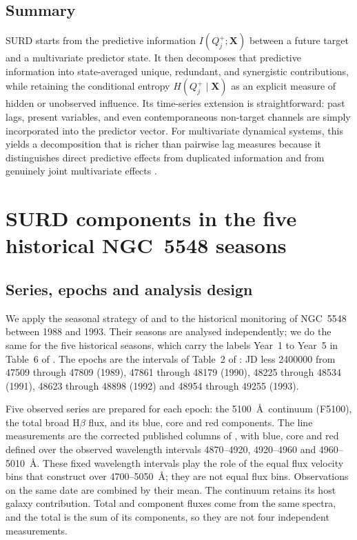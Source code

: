 \documentclass[fleqn,usenatbib]{mnras}
\begin{document}
\subsection{Summary}

SURD starts from the predictive information \(I(Q_j^+;\mathbf{X})\) between a future target and a multivariate predictor state. It then decomposes that predictive information into state-averaged unique, redundant, and synergistic contributions, while retaining the conditional entropy \(H(Q_j^+\mid \mathbf{X})\) as an explicit measure of hidden or unobserved influence. Its time-series extension is straightforward: past lags, present variables, and even contemporaneous non-target channels are simply incorporated into the predictor vector. For multivariate dynamical systems, this yields a decomposition that is richer than pairwise lag measures because it distinguishes direct predictive effects from duplicated information and from genuinely joint multivariate effects \citep{MartinezSanchez2024SURD,WilliamsBeer2010}.

\fi


\section{SURD components in the five historical NGC~5548 seasons}
\label{sec:epoch_surd_results}

\subsection{Series, epochs and analysis design}

We apply the seasonal strategy of \citet{Lu2022} and \citet{Xi2025} to the
historical monitoring of NGC~5548 between 1988 and 1993. Their seasons are
analysed independently; we do the same for the five historical seasons, which
carry the labels Year~1 to Year~5 in Table~6 of \citet{Lu2022}. The epochs are the
intervals of Table~2 of \citet{Peterson2004ApJ}: JD less 2400000 from 47509
through 47809 (1989), 47861 through 48179 (1990), 48225 through 48534 (1991),
48623 through 48898 (1992) and 48954 through 49255 (1993).

Five observed series are prepared for each epoch: the 5100~\AA\ continuum
(F5100), the total broad H$\beta$ flux, and its blue, core and red components.
The line measurements are the corrected published columns of
\citet{WandersPeterson1996}, with blue, core and red defined over the observed
wavelength intervals 4870--4920, 4920--4960 and 4960--5010~\AA. These fixed
wavelength intervals play the role of the equal flux velocity bins that
\citet{Xi2025} construct over 4700--5050~\AA; they are not equal flux bins.
Observations on the same date are combined by their mean. The continuum retains
its host galaxy contribution. Total and component fluxes come from the same
spectra, and the total is the sum of its components, so they are not four
independent measurements.
\end{document}
